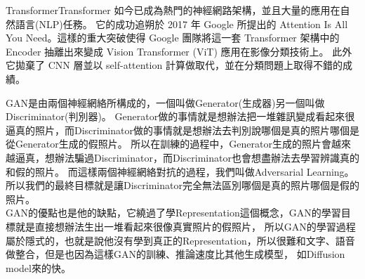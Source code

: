 \begin{flushleft}
  \hspace{2em}Transformer\cite{Transformer}Transformer 如今已成為熱門的神經網路架構，並且大量的應用在自然語言(NLP)任務。
  它的成功追朔於 2017 年 Google 所提出的 Attention Is All You Need。這樣的重大突破使得 Google 團隊將這一套 Transformer 架構中的 Encoder 抽離出來變成 Vision Transformer (ViT) 應用在影像分類技術上。
  此外它拋棄了 CNN 層並以 self-attention 計算做取代，並在分類問題上取得不錯的成績。

  \hspace{2em}GAN\cite{gan}是由兩個神經網絡所構成的，一個叫做Generator(生成器)另一個叫做Discriminator(判別器)。
  Generator做的事情就是想辦法把一堆雜訊變成看起來很逼真的照片，而Discriminator做的事情就是想辦法去判別說哪個是真的照片哪個是從Generator生成的假照片。
  所以在訓練的過程中，Generator生成的照片會越來越逼真，想辦法騙過Discriminator，而Discriminator也會想盡辦法去學習辨識真的和假的照片。
  而這樣兩個神經網絡對抗的過程，我們叫做Adversarial Learning。所以我們的最終目標就是讓Discriminator完全無法區別哪個是真的照片哪個是假的照片。
  \\\hspace*{2em}GAN的優點也是他的缺點，它繞過了學Representation這個概念，GAN的學習目標就是直接想辦法生出一堆看起來很像真實照片的假照片，
  所以GAN的學習過程屬於隱式的，也就是說他沒有學到真正的Representation，所以很難和文字、語音做整合，但是也因為這樣GAN的訓練、推論速度比其他生成模型，
  如Diffusion model來的快。
\end{flushleft}